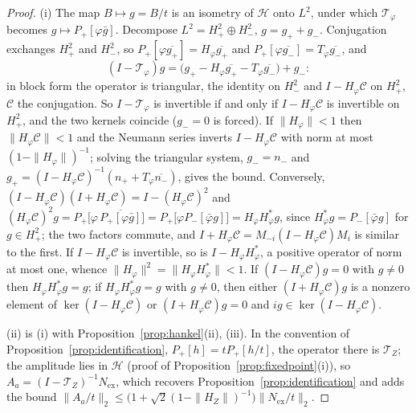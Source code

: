 \documentclass[11pt]{article}
\theoremstyle{definition}
\theoremstyle{remark}
\begin{document}
\begin{proof}
(i) The map $B\mapsto g=B/t$ is an isometry of $\mathcal H$ onto $L^2$, under which $\mathcal T_\varphi$ becomes $g\mapsto P_+[\varphi\bar g]$. Decompose $L^2=H^2_+\oplus H^2_-$, $g=g_++g_-$. Conjugation exchanges $H^2_+$ and $H^2_-$, so $P_+[\varphi\overline{g_+}]=H_\varphi\overline{g_+}$ and $P_+[\varphi\overline{g_-}]=T_\varphi\overline{g_-}$, and
\[
(I-\mathcal T_\varphi)g=\big(g_+-H_\varphi\overline{g_+}-T_\varphi\overline{g_-}\big)+g_- :
\]
in block form the operator is triangular, the identity on $H^2_-$ and $I-H_\varphi\mathcal C$ on $H^2_+$, $\mathcal C$ the conjugation. So $I-\mathcal T_\varphi$ is invertible if and only if $I-H_\varphi\mathcal C$ is invertible on $H^2_+$, and the two kernels coincide ($g_-=0$ is forced). If $\|H_\varphi\|<1$ then $\|H_\varphi\mathcal C\|<1$ and the Neumann series inverts $I-H_\varphi\mathcal C$ with norm at most $(1-\|H_\varphi\|)^{-1}$; solving the triangular system, $g_-=n_-$ and $g_+=(I-H_\varphi\mathcal C)^{-1}(n_++T_\varphi\overline{n_-})$, gives the bound. Conversely, $(I-H_\varphi\mathcal C)(I+H_\varphi\mathcal C)=I-(H_\varphi\mathcal C)^2$ and $(H_\varphi\mathcal C)^2g=P_+\big[\varphi\,\overline{P_+[\varphi\bar g]}\big]=P_+\big[\varphi P_-[\bar\varphi g]\big]=H_\varphi H_\varphi^*g$, since $H_\varphi^*g=P_-[\bar\varphi g]$ for $g\in H^2_+$; the two factors commute, and $I+H_\varphi\mathcal C=M_{-i}(I-H_\varphi\mathcal C)M_i$ is similar to the first. If $I-H_\varphi\mathcal C$ is invertible, so is $I-H_\varphi H_\varphi^*$, a positive operator of norm at most one, whence $\|H_\varphi\|^2=\|H_\varphi H_\varphi^*\|<1$. If $(I-H_\varphi\mathcal C)g=0$ with $g\ne0$ then $H_\varphi H_\varphi^*g=g$; if $H_\varphi H_\varphi^*g=g$ with $g\ne0$, then either $(I+H_\varphi\mathcal C)g$ is a nonzero element of $\ker(I-H_\varphi\mathcal C)$ or $(I+H_\varphi\mathcal C)g=0$ and $ig\in\ker(I-H_\varphi\mathcal C)$.

(ii) is (i) with Proposition~\ref{prop:hankel}(ii), (iii). In the convention of Proposition~\ref{prop:identification}, $P_+[h]=tP_+[h/t]$, the operator there is $\mathcal T_Z$; the amplitude lies in $\mathcal H$ (proof of Proposition~\ref{prop:fixedpoint}(i)), so $A_a=(I-\mathcal T_Z)^{-1}N_{\mathrm{ex}}$, which recovers Proposition~\ref{prop:identification} and adds the bound $\|A_a/t\|_2\le\big(1+\sqrt2(1-\|H_Z\|)^{-1}\big)\|N_{\mathrm{ex}}/t\|_2$.


\end{proof}
\end{document}
